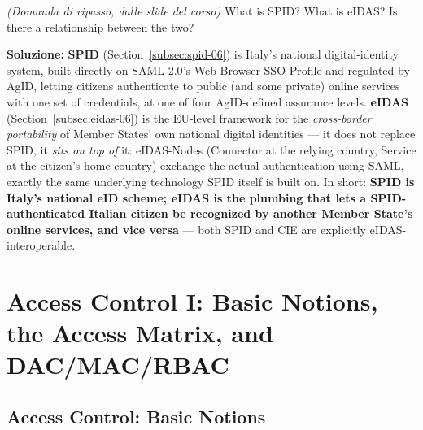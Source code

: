 \documentclass[12pt, a4paper]{article}
\newcounter{esercizio}[section]
\begin{document}
\begin{tcolorbox}[colback=lightergray!10, colframe=tocsec, title=\textbf{Esercizio \theesercizio}]
\textit{(Domanda di ripasso, dalle slide del corso)} What is SPID? What is eIDAS? Is there a relationship between the two?
\end{tcolorbox}

\textbf{Soluzione:} \textbf{SPID} (Section~\ref{subsec:spid-06}) is Italy's national digital-identity system, built directly on SAML 2.0's Web Browser SSO Profile and regulated by AgID, letting citizens authenticate to public (and some private) online services with one set of credentials, at one of four AgID-defined assurance levels. \textbf{eIDAS} (Section~\ref{subsec:eidas-06}) is the EU-level framework for the \emph{cross-border portability} of Member States' own national digital identities --- it does not replace SPID, it \emph{sits on top of} it: eIDAS-Nodes (Connector at the relying country, Service at the citizen's home country) exchange the actual authentication using SAML, exactly the same underlying technology SPID itself is built on. In short: \textbf{SPID is Italy's national eID scheme; eIDAS is the plumbing that lets a SPID-authenticated Italian citizen be recognized by another Member State's online services, and vice versa} --- both SPID and CIE are explicitly eIDAS-interoperable.










\section{Access Control I: Basic Notions, the Access Matrix, and DAC/MAC/RBAC}

\subsection{Access Control: Basic Notions}
\end{document}
